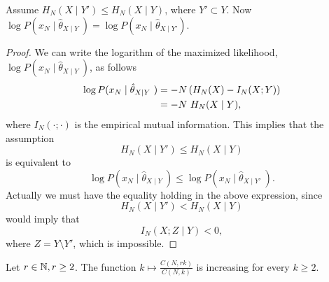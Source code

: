 \begin{lemma}
Assume $H_N(X \mid Y') \leq H_N(X \mid Y)$, where $Y' \subset Y$. Now $\log P(x_N \mid \hat{\theta}_{X\mid Y} \ ) = \log P(x_N \mid \hat{\theta}_{X\mid Y'})$.
\end{lemma}
\begin{proof}
We can write the logarithm of the maximized likelihood, \\ $\log P(x_N \mid \hat{\theta}_{X\mid Y} \ )$, as follows \citep{KOLLER}
\begin{align*}
\log P(x_N \mid \hat{\theta}_{X\mid Y} \ ) & = -N \left( H_N(X) - I_N(X;Y) \right) \\
&= -N \  H_N(X\mid Y),
\end{align*}where $I_N(\cdot;\cdot)$ is the empirical mutual information. This implies that the assumption
$$
H_N(X \mid Y') \leq H_N(X \mid Y)
$$ is equivalent to
$$
\log P(x_N \mid \hat{\theta}_{X\mid Y} \ ) \leq \log P(x_N \mid \hat{\theta}_{X\mid Y'} \ ) .
$$Actually we must have the equality holding in the above expression, since
$$
H_N(X \mid Y') < H_N(X \mid Y)
$$ would imply that
$$
I_N(X ; Z \mid Y ) < 0,
$$where $Z = Y \setminus Y'$, which is impossible.
\end{proof}
\begin{lemma}
Let $r \in \mathbb{N}, r \geq 2$.  The function $k \mapsto \frac{C(N,rk)}{C(N,k)}$ is increasing for every $k \geq 2$.
\end{lemma}

